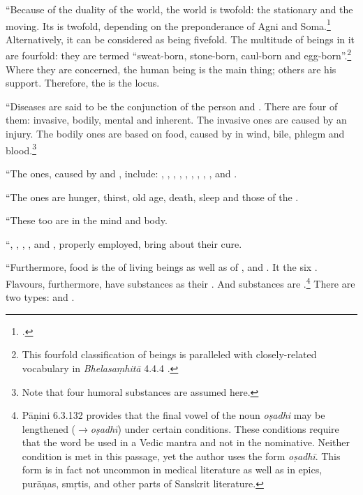 \begin{translation}
“Because of the duality of the world, the world is twofold: the
stationary and the moving. Its  is twofold,
depending on the preponderance of Agni and
Soma.\footcite[See][]{wuja-2004}  Alternatively, it can be considered
as being fivefold.  The multitude of beings in it are fourfold: they
are termed “sweat-born, stone-born, caul-born and
egg-born”.\footnote{This fourfold classification of beings is
    paralleled with closely-related vocabulary in  \emph{Bhelasaṃhitā}
    4.4.4 \parencites[206]{kris-2000}[81]{mook-1921}.}  Where they are
    concerned, the human being is the main thing; others are his support.
    Therefore, the  is the locus.
    
    \item[23--26]  

“Diseases are said to be the conjunction of the person and
. There are four of them: invasive, bodily,
mental and inherent.  The invasive ones are caused by an injury.  The
bodily ones are based on food, caused by
 in wind, bile, phlegm and
blood.\footnote{Note that four humoral substances are assumed here.}
    
“The  ones, caused by 
     and 
    , 
    include:  
    , 
    , 
    , 
    , 
    , 
    ,
    ,
    ,
    , 
    and
    .
    
“The  ones are hunger, thirst, old age, death, 
    sleep and  those of the .
    
“These too are  in the mind and body.

\item[27]    

“,
    ,
    ,
    ,
     and
    , 
    properly employed, bring about their cure.
    
    
    \item [28] 
    
“Furthermore, food is the   of living beings as well as
of ,  and . It  the six .
Flavours, furthermore, have substances as their
.  And substances are
.\footnote{Pāṇini 6.3.132 provides that the
    final vowel of the noun \emph{oṣadhi} may be lengthened
    (\emph{$\rightarrow$oṣadhī}) under certain conditions.  These
    conditions require that the word be used in a Vedic mantra and not in
    the nominative.  Neither condition is met in this passage, yet the
    author uses the form \emph{oṣadhī}. This form is in fact not uncommon
    in medical literature as well as in epics, purāṇas, smṛtis, and other
    parts of Sanskrit literature.} There are two types:
     and .
    

\end{translation}
